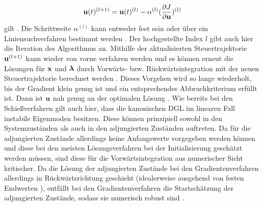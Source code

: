 \begin{equation}
\boldsymbol{\mathrm{u}}(t)^{(l+1)} = \boldsymbol{\mathrm{u}}(t)^{(l)} - \alpha^{(l)}(\frac{\partial J}{\partial \boldsymbol{\mathrm{u}}})^{(l)}
\end{equation}
gilt \cite{KnutGraichen.2012}. Die Schrittweite $\alpha^{(l)}$ kann entweder fest sein oder über ein Liniensuchverfahren bestimmt werden \cite{Papageorgiou.2012}. Der hochgestellte Index $l$ gibt auch hier die Iteration des Algorithmus an. Mithilfe der aktualisierten Steuertrajektorie $\boldsymbol{\mathrm{u}}^{(l+1)}$ kann wieder von vorne verfahren werden und es können erneut die Lösungen für $\boldsymbol{\mathrm{x}}$ und $\boldsymbol{\mathrm{\lambda}}$ durch Vorwärts- bzw. Rückwärtsintegration mit der neuen Steuertrajektorie berechnet werden \cite{Papageorgiou.2012}. Dieses Vorgehen wird so lange wiederholt, bis der Gradient klein genug ist und ein entsprechendes Abbruchkriterium erfüllt ist. Dann ist $\boldsymbol{\mathrm{u}}$ nah genug an der optimalen Lösung \cite{Papageorgiou.2012}. Wie bereits bei den Schießverfahren gilt auch hier, dass die kanonischen \gls{DGL} im linearen Fall instabile Eigenmoden besitzen. Diese können prinzipiell sowohl in den Systemzuständen als auch in den adjungierten Zuständen auftreten. Da für die adjungierten Zustände allerdings keine Anfangswerte vorgegeben werden können und diese bei den meisten Lösungsverfahren bei der Initialisierung geschätzt werden müssen, sind diese für die Vorwärtsintegration aus numerischer Sicht kritischer. Da die Lösung der adjungierten Zustände bei den Gradientenverfahren allerdings in Rückwärtsrichtung geschieht (idealerweise ausgehend von festen Endwerten \lambdaoftf), entfällt bei den Gradientenverfahren die Startschätzung der adjungierten Zustände, sodass sie numerisch robust sind \cite{KnutGraichen.2012}.
